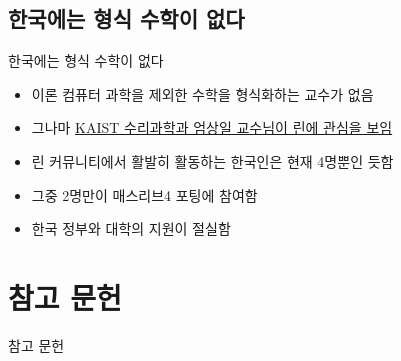 \documentclass{beamer}
\begin{document}
\subsection{한국에는 형식 수학이 없다}

\begin{frame}{한국에는 형식 수학이 없다}
  \begin{itemize}
    \item 이론 컴퓨터 과학을 제외한 수학을 형식화하는 교수가 없음
    \item 그나마 \href{https://twitter.com/sioum/status/1312178319777959937}{KAIST
      수리과학과 엄상일 교수님이 린에 관심을 보임}
    \item 린 커뮤니티에서 활발히 활동하는 한국인은 현재 4명뿐인 듯함
    \item 그중 2명만이 매스리브4 포팅에 참여함
    \item 한국 정부와 대학의 지원이 절실함
  \end{itemize}
\end{frame}

\section{참고 문헌}

\begin{frame}{참고 문헌}
  \printbibliography[heading=none]
\end{frame}
\end{document}
